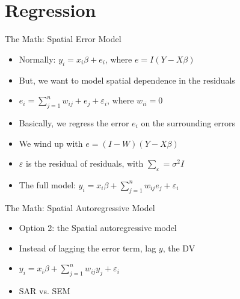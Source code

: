 \documentclass[aspectratio = 169, 12pt]{beamer}\usepackage[]{graphicx}\usepackage[]{color}
\begin{document}
\section{Regression}

\begin{frame}{The Math: Spatial Error Model}
\begin{itemize}
\item Normally: $y_i = x_{i}\beta + e_i$, where $e = I(Y- X\beta)$
\item But, we want to model spatial dependence in the residuals
\item $e_{i} = \sum_{j=1}^n w_{ij} + e_{j} + \varepsilon_{i}$, where $w_{ii} = 0$
\item Basically, we regress the error $e_i$ on the surrounding errors
\item We wind up with $e = (I-W)(Y- X\beta)$
\item $\varepsilon$ is the residual of residuals, with $\sum_{\varepsilon} = \sigma^{2}I$
\item The full model: $y_{i} = x_{i}\beta + \sum_{j=1}^{n} w_{ij}e_{j} + \varepsilon_{i}$
\end{itemize}
\end{frame}

\begin{frame}{The Math: Spatial Autoregressive Model}
\begin{itemize}
\item Option 2: the Spatial autoregressive model
\item Instead of lagging the error term, lag $y$, the DV
\item $y_{i} = x_{i}\beta + \sum_{j=1}^{n} w_{ij}y_{j} + \varepsilon_{i}$
\item SAR vs. SEM
\end{itemize}
\end{frame}
\end{document}
